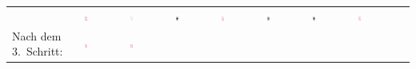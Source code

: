 \begin{tabular}{m{30mm}m{11mm}m{11mm}m{11mm}m{11mm}m{11mm}m{11mm}m{11mm}m{11mm}}
&
\includegraphics[width=0.08\textwidth]{./inf/SEKII/19_Java_Sortierverfahren/Herz10.png}
&
\includegraphics[width=0.08\textwidth]{./inf/SEKII/19_Java_Sortierverfahren/HerzAs.png}
&
\includegraphics[width=0.08\textwidth]{./inf/SEKII/19_Java_Sortierverfahren/HerzBube.png}
&
\includegraphics[width=0.08\textwidth]{./inf/SEKII/19_Java_Sortierverfahren/Herz7.png}
&
\includegraphics[width=0.08\textwidth]{./inf/SEKII/19_Java_Sortierverfahren/HerzKoenig.png}
&
\includegraphics[width=0.08\textwidth]{./inf/SEKII/19_Java_Sortierverfahren/HerzDame.png}
&
\includegraphics[width=0.08\textwidth]{./inf/SEKII/19_Java_Sortierverfahren/Herz9.png}
\\
Nach dem 3.\ Schritt: &
\includegraphics[width=0.08\textwidth]{./inf/SEKII/19_Java_Sortierverfahren/Herz8.png}
&
\includegraphics[width=0.08\textwidth]{./inf/SEKII/19_Java_Sortierverfahren/Herz10.png}

\end{tabular}
